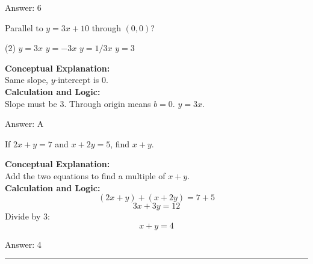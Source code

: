 \documentclass[11pt,paper=a4,answers]{exam}
\begin{document}
\begin{questions}
\begin{solution}
\vspace{15pt}
Answer: \colorbox{yellow!100}{6}
\end{solution}

\question
Parallel to $y = 3x + 10$ through $(0,0)$?
\begin{tasks}(2)
    \task $y = 3x$
    \task $y = -3x$
    \task $y = 1/3x$
    \task $y = 3$
\end{tasks}

\begin{solution}
\textbf{Conceptual Explanation:} \\
Same slope, $y$-intercept is 0.
\\[10pt]
\textbf{Calculation and Logic:} \\
Slope must be 3. Through origin means $b=0$. $y = 3x$.

\vspace{15pt}
Answer: \colorbox{yellow!100}{A}
\end{solution}

\question
If $2x + y = 7$ and $x + 2y = 5$, find $x + y$.

\begin{solution}
\textbf{Conceptual Explanation:} \\
Add the two equations to find a multiple of $x + y$.
\\[10pt]
\textbf{Calculation and Logic:} \\
\[(2x + y) + (x + 2y) = 7 + 5\]
\[3x + 3y = 12\]
Divide by 3:
\[x + y = 4\]

\vspace{15pt}
Answer: \colorbox{yellow!100}{4}
\end{solution}



\end{questions}
\begin{center}
\rule{.5\textwidth}{1pt}
\end{center}
\end{document}
